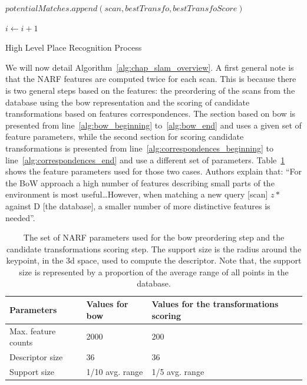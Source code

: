 \begin{algorithm}
\begin{algorithmic}[1]
        \State
        \State $potentialMatches.append(scan, bestTransfo, bestTransfoScore)$
        \EndIf

        \State
        \State $i \gets i+1$
        \EndWhile \label{alg:correspondences_end}

        \State
        \State {}
        \EndFunction
    \end{algorithmic}

    \caption{High Level Place Recognition Process}
    \label{alg:chap_slam_overview}
\end{algorithm}

We will now detail Algorithm~\ref{alg:chap_slam_overview}. A first general note is that the NARF features are computed twice for each scan. This is because there is two general steps based on the features: the preordering of the scans from the database using the \gls*{bow} representation and the scoring of candidate transformations based on features correspondences. The section based on \gls*{bow} is presented from line~\ref{alg:bow_beginning} to~\ref{alg:bow_end} and uses a given set of feature parameters, while the second section for scoring candidate transformations is presented from line~\ref{alg:correspondences_beginning} to line~\ref{alg:correspondences_end} and use a different set of parameters. Table~\ref{tab:chap_slam_narf_parameters} shows the feature parameters used for those two cases. Authors explain that: \enquote{For the BoW approach a high number of features describing small parts of the environment is most useful\dots However, when matching a new query [scan] $z*$ against D [the database], a smaller number of more distinctive features is needed}.

\begin{table}[H]
    \centering
    \begin{tabular}{@{}lll@{}}
        \toprule
        \textbf{Parameters}  & \textbf{Values for \gls*{bow}} & \textbf{Values for the transformations scoring} \\
        \hline
        Max. feature counts & 2000                          & 200                                \\
        Descriptor size     & 36                            & 36                                 \\
        Support size        & 1/10 avg. range               & 1/5 avg. range                     \\
        \bottomrule
    \end{tabular}
    \caption{The set of NARF parameters used for the \gls*{bow} preordering step and the candidate transformations scoring step. The support size is the radius around the keypoint, in the \gls*{3d} space, used to compute the descriptor. Note that, the support size is represented by a proportion of the average range of all points in the database.}
    \label{tab:chap_slam_narf_parameters}
\end{table}

